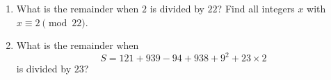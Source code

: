 \begin{enumerate}
\item[(a)] What is the remainder when $2$ is divided by $22$? Find all integers $x$ with $x\equiv2\pmod{22}$.
\item[(b)] What is the remainder when
\[S=121+939-94+938+9^2+23\times2\]
is divided by $23$?
\end{enumerate}
